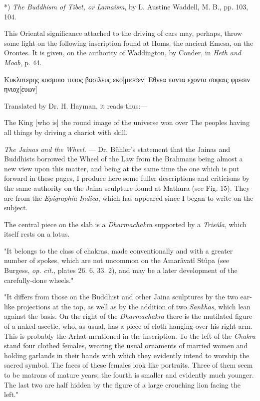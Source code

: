 \documentclass[a4paper, 11pt, oneside, polutonikogreek, english]{article}
\begin{document}
*) \emph{The Buddhism of Tibet, or Lamaism}, by L. Austine Waddell, M. B., pp. 103, 104.

This Oriental significance attached to the driving of cars may, perhaps, throw some light on the following inscription found at Homs, the ancient Emesa, on the Orontes. It is given, on the authority of Waddington, by Conder, in \emph{Heth and Moab}, p. 44.

Κυκλοτερης κοσμοιο τυπος βασιλευς εκο[μισσεν]  
Εθνεα παντα εχοντα σοφαις φρεσιν ηνιοχ[ευων]

Translated by Dr. H. Hayman, it reads thus:---

The King [who is] the round image of the universe won over  
The peoples having all things by driving a chariot with skill.

\emph{The Jainas and the Wheel.} --- Dr. Bühler's statement that the Jainas and Buddhists borrowed the Wheel of the Law from the Brahmans being almost a new view upon this matter, and being at the same time the one which is put forward in these pages, I produce here some fuller descriptions and criticisms by the same authority on the Jaina sculpture found at Mathura (see Fig. 15). They are from the \emph{Epigraphia Indica}, which has appeared since I began to write on the subject.

The central piece on the slab is a \emph{Dharmachakra} supported by a \emph{Trisûla}, which itself rests on a lotus.

"It belongs to the class of chakras, made conventionally and with a greater number of spokes, which are not uncommon on the Amarâvatî Stûpa (see Burgess, \emph{op. cit.}, plates 26. 6, 33. 2), and may be a later development of the carefully-done wheels."

"It differs from those on the Buddhist and other Jaina sculptures by the two ear-like projections at the top, as well as by the addition of two \emph{Sankhas}, which lean against the basis. On the right of the \emph{Dharmachakra} there is the mutilated figure of a naked ascetic, who, as usual, has a piece of cloth hanging over his right arm. This is probably the Arhat mentioned in the inscription. To the left of the \emph{Chakra} stand four clothed females, wearing the usual ornaments of married women and holding garlands in their hands with which they evidently intend to worship the sacred symbol. The faces of these females look like portraits. Three of them seem to be matrons of mature years; the fourth is smaller and evidently much younger. The last two are half hidden by the figure of a large crouching lion facing the left."
\end{document}
